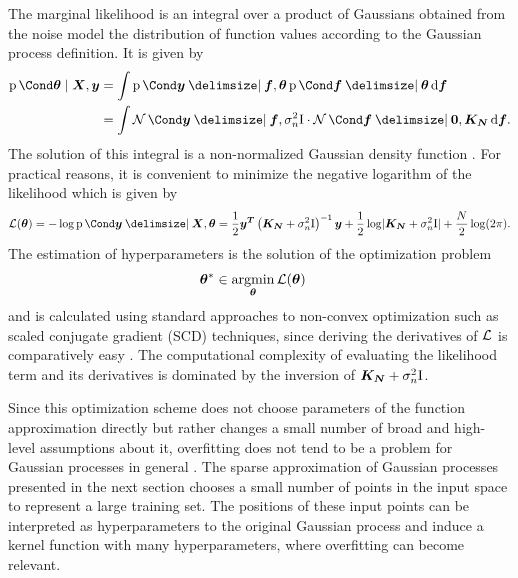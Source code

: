 The marginal likelihood is an integral over a product of Gaussians obtained from the noise model the distribution of function values according to the Gaussian process definition.
It is given by
\begin{align}
    \Prob{\mat{\theta} \mid \mat{X}, \mat{y}} &= \int \Prob{\mat{y} \given \mat{f}, \mat{\theta}} \Prob{\mat{f} \given \mat{\theta}} \diff \mat{f} \label{eq:gp_f_marginalization} \\
    &= \int \Gaussian{\mat{y} \given \mat{f}, \sigma_n^2 \Eye} \cdot \Gaussian{\mat{f} \given \mat{0}, \mat{K_N}} \diff \mat{f}.
\end{align}
The solution of this integral is a non-normalized Gaussian density function \cite{petersen_matrix_2008}.
For practical reasons, it is convenient to minimize the negative logarithm of the likelihood which is given by
\begin{align}
    \Ell(\mat{\theta}) = -\log\Prob{\mat{y} \given \mat{X}, \mat{\theta}} =
    \frac{1}{2} \mat{y^T} \left( \mat{K_N} + \sigma_n^2 \Eye \right)^{-1} \mat{y} +
    \frac{1}{2} \log \abs{\mat{K_N} + \sigma_n^2 \Eye} +
    \frac{N}{2} \log(2\pi).
\end{align}
The estimation of hyperparameters is the solution of the optimization problem
\begin{align}
    \bm{\theta}^\ast &\in \operatorname*{argmin}_{\bm{\theta}} \operatorname{\mathcal{L}}(\bm{\theta})
\end{align}
and is calculated using standard approaches to non-convex optimization such as scaled conjugate gradient (SCD) techniques, since deriving the derivatives of $\operatorname{\mathcal{L}}$ is comparatively easy \cite{rasmussen_gaussian_2006}.
The computational complexity of evaluating the likelihood term and its derivatives is dominated by the inversion of $\bm{K_N} + \sigma_n^2 \mathrm{I}$.

Since this optimization scheme does not choose parameters of the function approximation directly but rather changes a small number of broad and high-level assumptions about it, overfitting does not tend to be a problem for Gaussian processes in general \cite{rasmussen_gaussian_2006}.
The sparse approximation of Gaussian processes presented in the next section chooses a small number of points in the input space to represent a large training set.
The positions of these input points can be interpreted as hyperparameters to the original Gaussian process and induce a kernel function with many hyperparameters, where overfitting can become relevant.


